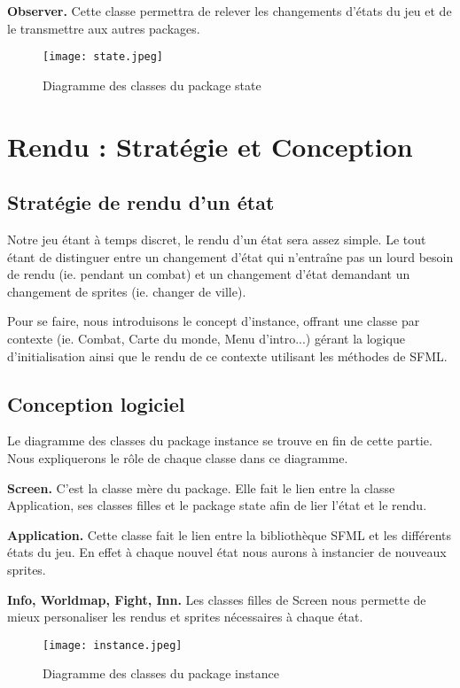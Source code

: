 \documentclass[12pt,a4paper]{report}
\begin{document}
\textbf{Observer.} Cette classe permettra de relever les changements d'\'{e}tats du jeu et de le transmettre aux autres packages.

\begin{sidewaysfigure}[ht]
\caption{Diagramme des classes du package state}
\texttt{[image: state.jpeg]}
\end{sidewaysfigure}

\chapter{Rendu : Strat\'{e}gie et Conception}
\section{Strat\'{e}gie de rendu d'un état}
Notre jeu \'{e}tant à temps discret, le rendu d'un \'{e}tat sera assez simple. Le tout étant de distinguer entre un changement d'\'{e}tat qui n'entra\^{i}ne pas un lourd besoin de rendu (ie. pendant un combat) et un changement d'\'{e}tat demandant un changement de sprites (ie. changer de ville).

Pour se faire, nous introduisons le concept d'instance, offrant une classe par contexte (ie. Combat, Carte du monde, Menu d'intro...) g\'{e}rant la logique d'initialisation ainsi que le rendu de ce contexte utilisant les m\'{e}thodes de SFML.
\section{Conception logiciel}
Le diagramme des classes du package instance se trouve en fin de cette partie. Nous expliquerons le r\^{o}le de chaque classe dans ce diagramme.

\textbf{Screen.} C'est la classe m\`{e}re du package. Elle fait le lien entre la classe Application, ses classes filles et le package state afin de lier l'\'{e}tat et le rendu.

\textbf{Application.} Cette classe fait le lien entre la biblioth\`{e}que SFML et les diff\'{e}rents \'{e}tats du jeu. En effet \`{a} chaque nouvel \'{e}tat nous aurons \`{a} instancier de nouveaux sprites.

\textbf{Info, Worldmap, Fight, Inn.} Les classes filles de Screen nous permette de mieux personaliser les rendus et sprites n\'{e}cessaires \`{a} chaque \'{e}tat.

\begin{sidewaysfigure}[ht]
\caption{Diagramme des classes du package instance}
\texttt{[image: instance.jpeg]}
\end{sidewaysfigure}
 
\end{document}
